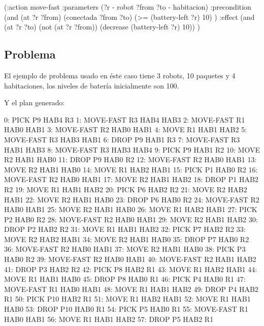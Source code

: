 \documentclass[	DIV=calc,%
							paper=a4,%
							fontsize=11pt]{scrartcl}	 					%
\newcommand{\lispscript}[2]{
    \myLisp[label=#2]{#1}
}
\begin{document}
\begin{newlispcode}
  (:action move-fast
    :parameters (?r - robot ?from ?to - habitacion)
    :precondition (and
                    (at ?r ?from)
                    (conectada ?from ?to)
                    (>= (battery-left ?r) 10)
                    )
    :effect (and
              (at ?r ?to)
              (not (at ?r ?from))
              (decrease (battery-left ?r) 10))
  )
\end{newlispcode}

\subsection{Problema}
\label{sub:Problema}

El ejemplo de problema usado en éste caso tiene 3 robots, 10 paquetes y 4 habitaciones, los niveles de batería inicialmente son 100.

\lispscript{../p1e3.pddl}{p1e3.pddl}

Y el plan generado:

\begin{bashcode}
	        0: PICK P9 HAB4 R3
	        1: MOVE-FAST R3 HAB4 HAB3
	        2: MOVE-FAST R1 HAB0 HAB1
	        3: MOVE-FAST R2 HAB0 HAB1
	        4: MOVE R1 HAB1 HAB2
	        5: MOVE-FAST R3 HAB3 HAB1
	        6: DROP P9 HAB1 R3
	        7: MOVE-FAST R3 HAB1 HAB3
	        8: MOVE-FAST R3 HAB3 HAB4
	        9: PICK P9 HAB1 R2
	       10: MOVE R2 HAB1 HAB0
	       11: DROP P9 HAB0 R2
	       12: MOVE-FAST R2 HAB0 HAB1
	       13: MOVE R2 HAB1 HAB0
	       14: MOVE R1 HAB2 HAB1
	       15: PICK P1 HAB0 R2
	       16: MOVE-FAST R2 HAB0 HAB1
	       17: MOVE R2 HAB1 HAB2
	       18: DROP P1 HAB2 R2
	       19: MOVE R1 HAB1 HAB2
	       20: PICK P6 HAB2 R2
	       21: MOVE R2 HAB2 HAB1
	       22: MOVE R2 HAB1 HAB0
	       23: DROP P6 HAB0 R2
	       24: MOVE-FAST R2 HAB0 HAB1
	       25: MOVE R2 HAB1 HAB0
	       26: MOVE R1 HAB2 HAB1
	       27: PICK P2 HAB0 R2
	       28: MOVE-FAST R2 HAB0 HAB1
	       29: MOVE R2 HAB1 HAB2
	       30: DROP P2 HAB2 R2
	       31: MOVE R1 HAB1 HAB2
	       32: PICK P7 HAB2 R2
	       33: MOVE R2 HAB2 HAB1
	       34: MOVE R2 HAB1 HAB0
	       35: DROP P7 HAB0 R2
	       36: MOVE-FAST R2 HAB0 HAB1
	       37: MOVE R2 HAB1 HAB0
	       38: PICK P3 HAB0 R2
	       39: MOVE-FAST R2 HAB0 HAB1
	       40: MOVE-FAST R2 HAB1 HAB2
	       41: DROP P3 HAB2 R2
	       42: PICK P8 HAB2 R1
	       43: MOVE R1 HAB2 HAB1
	       44: MOVE R1 HAB1 HAB0
	       45: DROP P8 HAB0 R1
	       46: PICK P4 HAB0 R1
	       47: MOVE-FAST R1 HAB0 HAB1
	       48: MOVE R1 HAB1 HAB2
	       49: DROP P4 HAB2 R1
	       50: PICK P10 HAB2 R1
	       51: MOVE R1 HAB2 HAB1
	       52: MOVE R1 HAB1 HAB0
	       53: DROP P10 HAB0 R1
	       54: PICK P5 HAB0 R1
	       55: MOVE-FAST R1 HAB0 HAB1
	       56: MOVE R1 HAB1 HAB2
	       57: DROP P5 HAB2 R1
\end{bashcode}
\end{document}
